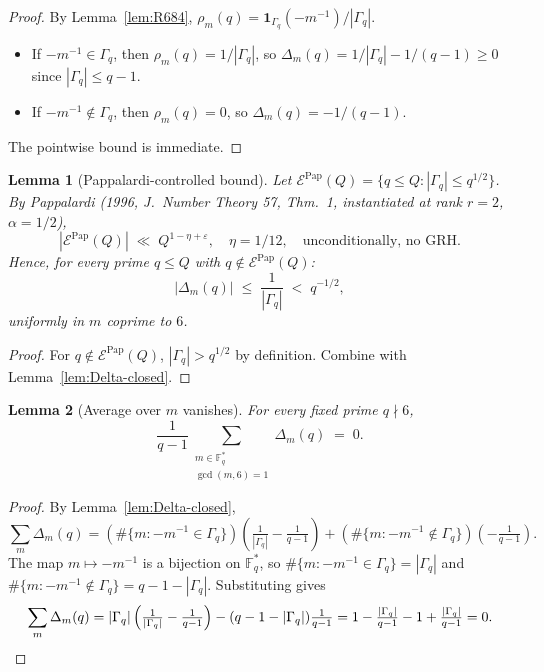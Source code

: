 \documentclass[12pt]{amsart}
\newtheorem{lemma}{Lemma}
\theoremstyle{definition}
\theoremstyle{remark}
\begin{document}
\begin{proof}
By Lemma~\ref{lem:R684}, $\rho_m(q) = \mathbf{1}_{\Gamma_q}(-m^{-1}) / |\Gamma_q|$.
\begin{itemize}
\item If $-m^{-1} \in \Gamma_q$, then $\rho_m(q) = 1/|\Gamma_q|$, so
$\Delta_m(q) = 1/|\Gamma_q| - 1/(q-1) \ge 0$ since $|\Gamma_q| \le q - 1$.
\item If $-m^{-1} \notin \Gamma_q$, then $\rho_m(q) = 0$, so $\Delta_m(q) = -1/(q-1)$.
\end{itemize}
The pointwise bound is immediate.
\end{proof}

\begin{lemma}[Pappalardi-controlled bound]\label{lem:Delta-Pap}
Let $\mathcal{E}^{\mathrm{Pap}}(Q) = \{q \le Q : |\Gamma_q| \le q^{1/2}\}$.
By Pappalardi (1996, J.~Number Theory 57, Thm.~1, instantiated at rank $r = 2$, $\alpha = 1/2$),
$$
|\mathcal{E}^{\mathrm{Pap}}(Q)| \;\ll\; Q^{1 - \eta + \varepsilon},
\quad
\eta = 1/12,
\quad
\text{unconditionally, no GRH.}
$$
Hence, for every prime $q \le Q$ with $q \notin \mathcal{E}^{\mathrm{Pap}}(Q)$:
$$
|\Delta_m(q)| \;\le\; \frac{1}{|\Gamma_q|} \;<\; q^{-1/2},
$$
uniformly in $m$ coprime to $6$.
\end{lemma}

\begin{proof}
For $q \notin \mathcal{E}^{\mathrm{Pap}}(Q)$, $|\Gamma_q| > q^{1/2}$ by definition.
Combine with Lemma~\ref{lem:Delta-closed}.
\end{proof}

\begin{lemma}[Average over $m$ vanishes]\label{lem:Delta-avg}
For every fixed prime $q \nmid 6$,
$$
\frac{1}{q - 1}
\sum_{\substack{m \in \mathbb{F}_q^* \\ \gcd(m, 6) = 1}}
\Delta_m(q)
\;=\;
0.
$$
\end{lemma}

\begin{proof}
By Lemma~\ref{lem:Delta-closed},
$$
\sum_m \Delta_m(q) = (\text{$\#\{m : -m^{-1} \in \Gamma_q\}$}) \left(\tfrac{1}{|\Gamma_q|} - \tfrac{1}{q-1}\right) + (\text{$\#\{m : -m^{-1} \notin \Gamma_q\}$}) \left(- \tfrac{1}{q-1}\right).
$$
The map $m \mapsto -m^{-1}$ is a bijection on $\mathbb{F}_q^*$, so
$\#\{m : -m^{-1} \in \Gamma_q\} = |\Gamma_q|$ and
$\#\{m : -m^{-1} \notin \Gamma_q\} = q - 1 - |\Gamma_q|$. Substituting gives
$$
\sum_m \Delta_m(q) = |\Gamma_q| \left(\tfrac{1}{|\Gamma_q|} - \tfrac{1}{q-1}\right) - (q - 1 - |\Gamma_q|) \tfrac{1}{q-1}
= 1 - \tfrac{|\Gamma_q|}{q-1} - 1 + \tfrac{|\Gamma_q|}{q-1} = 0.
\qedhere
$$
\end{proof}
\end{document}
